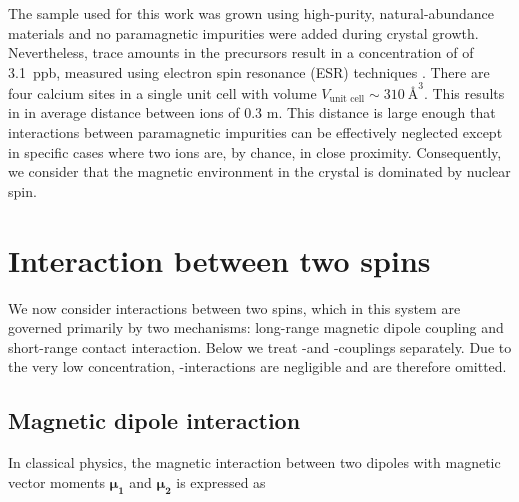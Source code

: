 The sample used for this work was grown using high-purity, natural-abundance materials and no paramagnetic impurities were added during crystal growth. Nevertheless, trace amounts in the precursors result in a concentration of \Er of 3.1~ppb, measured using electron spin resonance (ESR) techniques . There are four calcium sites in a single unit cell with volume $V_{\text{unit cell}}\sim310\ \text{\AA}^3$. This results in in average distance between ions of 0.3 \textmu m.  
This distance is large enough that interactions between paramagnetic impurities can be effectively neglected except in specific cases where two ions are, by chance, in close proximity. Consequently, we consider that the magnetic environment in the crystal is dominated by \W nuclear spin.

\section{Interaction between two spins}

We now consider interactions between two spins, which in this system are governed primarily by two mechanisms: long-range magnetic dipole coupling and short-range contact interaction. Below we treat \Er-\W and \W-\W couplings separately. Due to the very low \Er concentration, \Er-\Er interactions are negligible and are therefore omitted.

\subsection{Magnetic dipole interaction}

In classical physics, the magnetic interaction between two dipoles with magnetic vector moments $\boldsymbol{\mu_1}$ and $\boldsymbol{\mu_2}$ is expressed as


